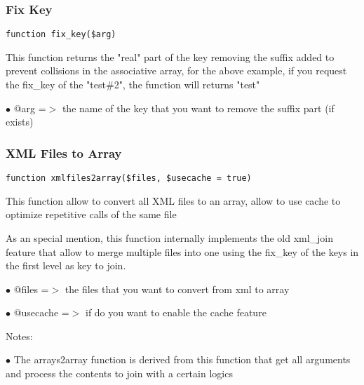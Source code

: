 \documentclass[a4paper]{article}
\begin{document}
\hypertarget{toc277}{}
\subsubsection{Fix Key}

\begin{lstlisting}
function fix_key($arg)
\end{lstlisting}

This function returns the "real" part of the key removing the suffix added to
prevent collisions in the associative array, for the above example, if you request
the fix\_key of the "test\#2", the function will returns "test"

\begin{compactitem}
\item[\color{myblue}$\bullet$] @arg =$>$ the name of the key that you want to remove the suffix part (if exists)
\end{compactitem}

\hypertarget{toc278}{}
\subsubsection{XML Files to Array}

\begin{lstlisting}
function xmlfiles2array($files, $usecache = true)
\end{lstlisting}

This function allow to convert all XML files to an array, allow to use cache to
optimize repetitive calls of the same file

As an special mention, this function internally implements the old xml\_join feature
that allow to merge multiple files into one using the fix\_key of the keys in the first
level as key to join.

\begin{compactitem}
\item[\color{myblue}$\bullet$] @files    =$>$ the files that you want to convert from xml to array
\item[\color{myblue}$\bullet$] @usecache =$>$ if do you want to enable the cache feature
\end{compactitem}

Notes:

\begin{compactitem}
\item[\color{myblue}$\bullet$] The arrays2array function is derived from this function that get all arguments and
  process the contents to join with a certain logics
\end{compactitem}
\end{document}
